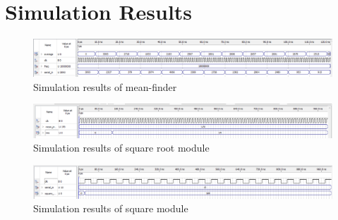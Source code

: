 \documentclass[10pt]{article}
\begin{document}
\section*{Simulation Results}
\begin{figure}[H]
  \includegraphics[scale=0.5, center]{Mean_finder}
  \caption{Simulation results of mean-finder}
  \label{fig:zero}
\end{figure}


\begin{figure}[H]
  \includegraphics[scale=0.5, center]{Rms_out}
  \caption{Simulation results of square root module}
  \label{fig:zero}
\end{figure}

\begin{figure}[H]
  \includegraphics[scale=0.5, center]{square}
  \caption{Simulation results of square module}
  \label{fig:zero}
\end{figure}
\end{document}
